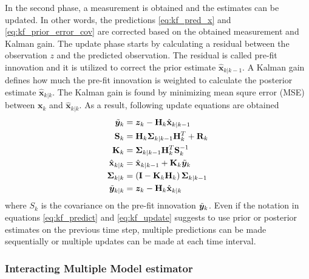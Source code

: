 \documentclass[english, 12pt, a4paper, elec, utf8, a-1b, online]{aaltothesis}
\newcommand{\inv}[1]{#1^{-1}}
\newcommand{\xprior}{\hat{\vec{x}}_{k|k-1}}
\newcommand{\xpost}{\hat{\vec{x}}_{k|k}}
\newcommand{\priorecov}{\boldsymbol{\Sigma}_{k|k-1}}
\newcommand{\postecov}{\boldsymbol{\Sigma}_{k|k}}
\newcommand{\prefitinnov}{\Tilde{\bm{y}}_k}
\newcommand{\postfitinnov}{\Tilde{\bm{y}}_{k|k}}
\renewcommand{\vec}[1]{\mathbf{#1}}
\newcommand{\x}{\bm{x}_k}
\newcommand{\z}{\bm{z}_k}
\newcommand{\omodel}{\vec{H}_k}
\newcommand{\ocov}{\vec{R}_k}
\newcommand{\innocov}{\vec{S}_k}
\newcommand{\eye}{\vec{I}}
\newcommand{\gain}{\vec{K}_k}
\begin{document}
In the second phase, a measurement is obtained and the estimates can be updated. 
In other words, the predictions \eqref{eq:kf_pred_x} and \eqref{eq:kf_prior_error_cov} are corrected based on the obtained measurement and Kalman gain.
The update phase starts by calculating a residual between the observation $z$ and the predicted observation.
The residual is called pre-fit innovation and it is utilized to correct the prior estimate $\xprior$.
A Kalman gain defines how much the pre-fit innovation is weighted to calculate the posterior estimate $\xpost$.
The Kalman gain is found by minimizing mean squre error (MSE) between $\x$ and $\xpost$.
As a result, following update equations are obtained
\begin{subequations}
\label{eq:kf_update}
\begin{align}
    \prefitinnov &= \z - \omodel \xprior \label{eq:kf_prefit_innov}\\ 
    \innocov &= \omodel \priorecov \omodel^T + \ocov \label{eq:kf_innov_cov}\\ 
    \gain &= \priorecov \omodel^T \inv{\innocov} \label{eq:kf_gain}\\ 
    \xpost &= \xprior + \gain \prefitinnov \label{eq:kf_update_x}\\ 
    \postecov &= \left( \eye - \gain \omodel \right) \priorecov  \label{eq:kf_post_error_cov}\\
    \postfitinnov &= \z - \omodel \xpost \label{eq:kf_postfit_innov}
\end{align}
\end{subequations}
where $S_k$ is the covariance on the pre-fit innovation $\prefitinnov$. 
Even if the notation in equations \eqref{eq:kf_predict} and \eqref{eq:kf_update} suggests to use prior or posterior estimates on the previous time step, multiple predictions can be made sequentially or multiple updates can be made at each time interval.



\subsubsection{Interacting Multiple Model estimator}
\label{sec:IMM}
\end{document}
